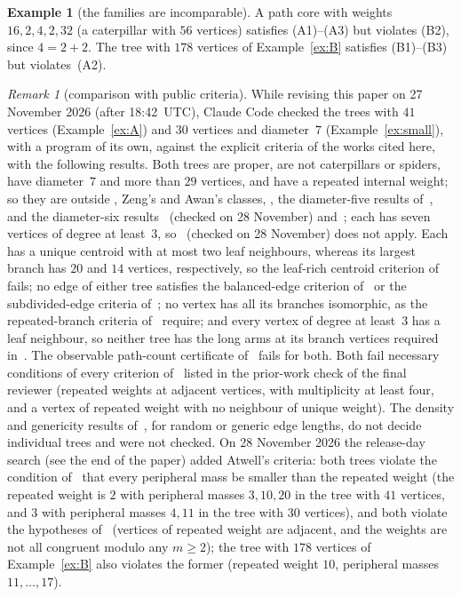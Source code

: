 \documentclass[11pt]{article}
\theoremstyle{definition}
\newtheorem{example}[lemma]{Example}
\theoremstyle{remark}
\newtheorem{remark}[lemma]{Remark}
\begin{document}
\begin{example}[the families are incomparable]\label{ex:incomp}
A path core with weights $16,2,4,2,32$ (a caterpillar with $56$ vertices)
satisfies (A1)--(A3) but violates (B2), since $4=2+2$. The tree with $178$
vertices of Example~\ref{ex:B} satisfies (B1)--(B3) but violates~(A2).
\end{example}

\begin{remark}[comparison with public criteria]\label{rem:public}
While revising this paper on 27 November 2026 (after 18:42~UTC), Claude Code
checked the trees with $41$ vertices (Example~\ref{ex:A}) and $30$ vertices and
diameter~$7$ (Example~\ref{ex:small}), with a program of its own, against the
explicit criteria of the works cited here, with the following results. Both
trees are proper, are not caterpillars or spiders, have diameter~$7$ and more
than $29$ vertices, and have a repeated internal weight; so they are outside
\cite{mmw,apz,ls,hj}, Zeng's and Awan's classes, \cite[Corollary~5.15]{got},
the diameter-five results of~\cite{got,apdmoz}, and the diameter-six results~\cite{kyf} (checked on 28 November)
and~\cite[pull request~1081]{sc}; each has seven vertices of degree at least~$3$,
so~\cite{carp} (checked on 28 November) does not apply. Each has a unique centroid with at most two
leaf neighbours, whereas its largest branch has $20$ and $14$ vertices,
respectively, so the leaf-rich centroid criterion of~\cite[pull request~977]{sc}
fails; no edge of either tree satisfies the balanced-edge criterion
of~\cite[pull request~977]{sc} or the subdivided-edge criteria of~\cite[pull
requests~972 and~977]{sc}; no vertex has all its branches isomorphic, as the
repeated-branch criteria of~\cite[pull request~972]{sc} require; and every vertex
of degree at least~$3$ has a leaf neighbour, so neither tree has the long arms at
its branch vertices required in~\cite[pull requests~985, 1024 and~1029]{sc}. The
observable path-count certificate of~\cite[pull request~1030]{sc} fails for
both. Both fail necessary conditions of every criterion of~\cite{aur} listed in
the prior-work check of the final reviewer (repeated weights at adjacent vertices,
with multiplicity at least four, and a vertex of repeated weight with no neighbour
of unique weight). The density and genericity results of~\cite{sc}, for random or generic edge lengths, do not decide individual trees
and were not checked. On 28 November 2026 the release-day search (see the end of
the paper) added Atwell's criteria: both trees violate the condition
of~\cite[Theorem~2.1]{atwell1} that every peripheral mass be smaller than the
repeated weight (the repeated weight is $2$ with peripheral masses $3,10,20$ in the tree with $41$
vertices, and $3$ with peripheral masses $4,11$ in the tree with $30$ vertices), and both
violate the hypotheses of~\cite{atwell2} (vertices of repeated weight are adjacent,
and the weights are not all congruent modulo any $m\ge2$); the tree with $178$
vertices of Example~\ref{ex:B} also violates the former (repeated weight $10$,
peripheral masses $11,\dots,17$).
\end{remark}
\end{document}
